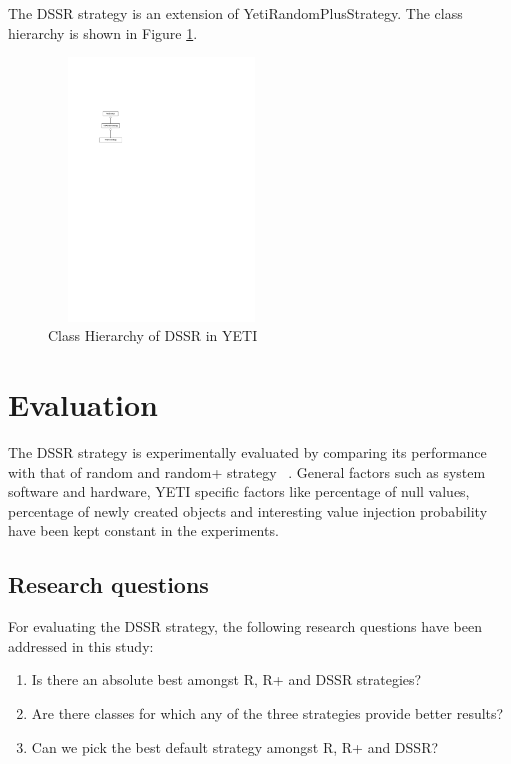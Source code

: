 The DSSR strategy is an extension of YetiRandomPlusStrategy. The class hierarchy is shown in Figure \ref{fig:hierarchyofDSSR}.

\begin{figure}[h]
\centering
\includegraphics[width=6cm,height=7cm]{chapter4/hierarchy.pdf}
\caption{Class Hierarchy of DSSR in YETI}
\label{fig:hierarchyofDSSR}
\end{figure}







\section{Evaluation}\label{sec:eval}

The DSSR strategy is experimentally evaluated by comparing its performance with that of random and random+ strategy ~\cite{leitner2007reconciling}. General factors such as system software and hardware, YETI specific factors like percentage of null values, percentage of newly created objects and interesting value injection probability have been kept constant in the experiments.

\subsection{Research questions}
For evaluating the DSSR strategy, the following research questions have been addressed in this study:
\begin{enumerate}
\item Is there an absolute best amongst R, R+ and DSSR strategies?
\item Are there classes for which any of the three strategies provide better results?
\item Can we pick the best default strategy amongst R, R+ and DSSR?
\end{enumerate}




